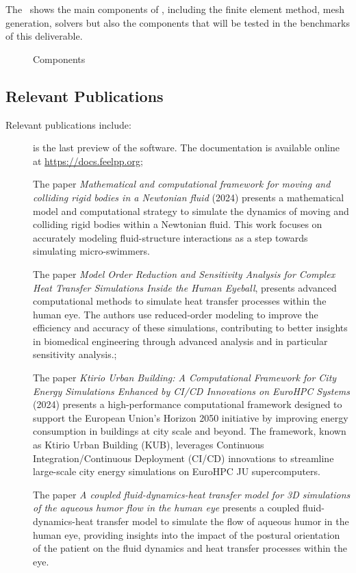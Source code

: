 The~ shows the main components of \Feelpp, including the finite element method, mesh generation, solvers but also the components that will be tested in the benchmarks of this deliverable.

\begin{figure}
        
        \caption{\Feelpp Components}
        \label{fig:Feelpp:components}
\end{figure}

\subsection{Relevant Publications}
\label{sec:Feelpp:publications}
Relevant publications include:

\begin{description}
        \item[] is the last preview of the \Feelpp software. The documentation is available online at \url{https://docs.feelpp.org};
        \item[] The paper \emph{Mathematical and computational framework for moving and colliding rigid bodies in a Newtonian fluid} (2024) presents a mathematical model and computational strategy to simulate the dynamics of moving and colliding rigid bodies within a Newtonian fluid. This work focuses on accurately modeling fluid-structure interactions as a step towards simulating micro-swimmers.
        \item[] The paper \emph{Model Order Reduction and Sensitivity Analysis for Complex Heat Transfer Simulations Inside the Human Eyeball}, presents advanced computational methods to simulate heat transfer processes within the human eye. The authors use reduced-order modeling to improve the efficiency and accuracy of these simulations, contributing to better insights in biomedical engineering through advanced analysis and in particular sensitivity analysis.;
        \item[] The paper \emph{Ktirio Urban Building: A Computational Framework for City Energy Simulations Enhanced by CI/CD Innovations on EuroHPC Systems} (2024) presents a high-performance computational framework designed to support the European Union's Horizon 2050 initiative by improving energy consumption in buildings at city scale and beyond. The framework, known as Ktirio Urban Building (KUB), leverages Continuous Integration/Continuous Deployment (CI/CD) innovations to streamline large-scale city energy simulations on EuroHPC JU supercomputers.
        \item[] The paper \emph{A coupled fluid-dynamics-heat transfer model for 3D simulations of the aqueous humor flow in the human eye} presents a coupled fluid-dynamics-heat transfer model to simulate the flow of aqueous humor in the human eye, providing insights into the impact of the postural orientation of the patient on the fluid dynamics and heat transfer processes within the eye.
\end{description}

